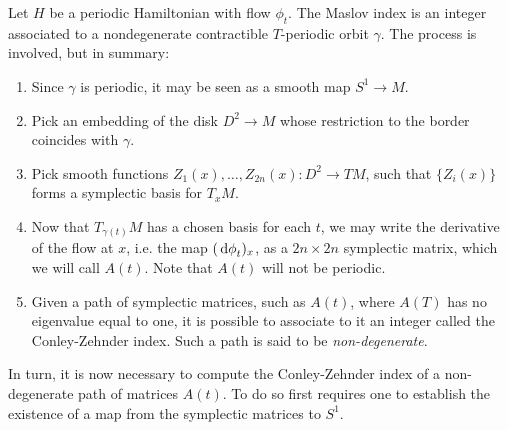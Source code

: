 Let $H$ be a periodic Hamiltonian with flow $\phi_t$. The Maslov index is an integer associated to a nondegenerate contractible $T$-periodic orbit $\gamma$. The process is involved, but in summary:
\begin{algorithm}\label{alg:maslovalg}
\begin{enumerate}[algorithm]
\item\label{maslovalg:step1} Since $\gamma$ is periodic, it may be seen as a smooth map $S^1 \to M$.
\item\label{maslovalg:step2} Pick an embedding of the disk $D^2 \to M$ whose restriction to the border coincides with $\gamma$.
\item\label{maslovalg:step3} Pick smooth functions $Z_1(x), \dots, Z_{2n}(x) \colon D^2 \to TM$, such that $\{Z_i(x)\}$ forms a symplectic basis for $T_x M$.
\item\label{maslovalg:step4} Now that $T_{\gamma(t)} M$ has a chosen basis for each $t$, we may write the derivative of the flow at $x$, i.e. the map $(\dl \phi_t)_x$, as a $2n \times 2n$ symplectic matrix, which we will call $A(t)$. Note that $A(t)$ will not be periodic.
\item\label{maslovalg:step5} Given a path of symplectic matrices, such as $A(t)$, where $A(T)$ has no eigenvalue equal to one, it is possible to associate to it an integer called the Conley-Zehnder index. Such a path is said to be \emph{non-degenerate}.
\end{enumerate}
\end{algorithm}

In turn, it is now necessary to compute the Conley-Zehnder index of a non-degenerate path of matrices $A(t)$. To do so first requires one to establish the existence of a map from the symplectic matrices to $S^1$.

